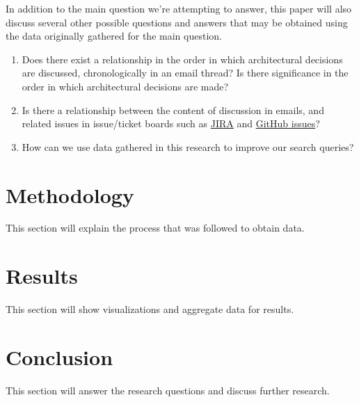 \documentclass[a4paper, 12pt]{article}
\begin{document}
	In addition to the main question we're attempting to answer, this paper will also discuss several other possible questions and answers that may be obtained using the data originally gathered for the main question.
	
	\begin{enumerate}
		\item Does there exist a relationship in the order in which architectural decisions are discussed, chronologically in an email thread? Is there significance in the order in which architectural decisions are made?
		
		\item Is there a relationship between the content of discussion in emails, and related issues in issue/ticket boards such as \href{https://www.atlassian.com/software/jira}{JIRA} and \href{https://github.com/features/issues}{GitHub issues}?
		
		\item How can we use data gathered in this research to improve our search queries?
	\end{enumerate}

\section{Methodology}
	This section will explain the process that was followed to obtain data.

\section{Results}
	This section will show visualizations and aggregate data for results.

\section{Conclusion}
	This section will answer the research questions and discuss further research.

\newpage
\printbibliography
\end{document}
